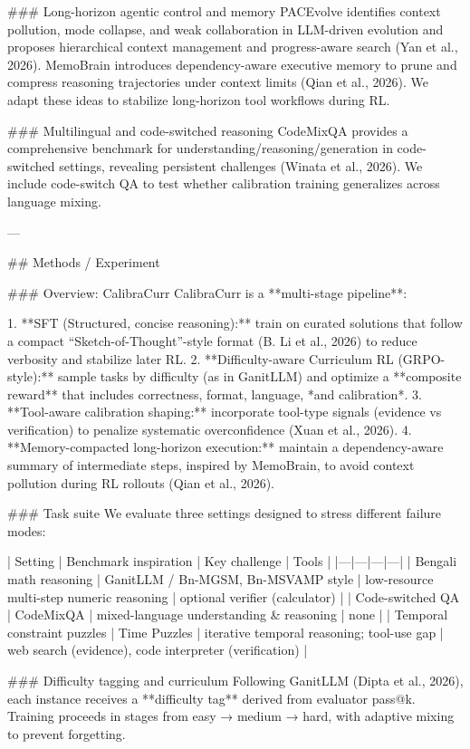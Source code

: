 ### Long-horizon agentic control and memory  
PACEvolve identifies context pollution, mode collapse, and weak collaboration in LLM-driven evolution and proposes hierarchical context management and progress-aware search (Yan et al., 2026). MemoBrain introduces dependency-aware executive memory to prune and compress reasoning trajectories under context limits (Qian et al., 2026). We adapt these ideas to stabilize long-horizon tool workflows during RL.

### Multilingual and code-switched reasoning  
CodeMixQA provides a comprehensive benchmark for understanding/reasoning/generation in code-switched settings, revealing persistent challenges (Winata et al., 2026). We include code-switch QA to test whether calibration training generalizes across language mixing.

---

## Methods / Experiment  

### Overview: CalibraCurr  
CalibraCurr is a **multi-stage pipeline**:

1. **SFT (Structured, concise reasoning):** train on curated solutions that follow a compact “Sketch-of-Thought”-style format (B. Li et al., 2026) to reduce verbosity and stabilize later RL.  
2. **Difficulty-aware Curriculum RL (GRPO-style):** sample tasks by difficulty (as in GanitLLM) and optimize a **composite reward** that includes correctness, format, language, *and calibration*.  
3. **Tool-aware calibration shaping:** incorporate tool-type signals (evidence vs verification) to penalize systematic overconfidence (Xuan et al., 2026).  
4. **Memory-compacted long-horizon execution:** maintain a dependency-aware summary of intermediate steps, inspired by MemoBrain, to avoid context pollution during RL rollouts (Qian et al., 2026).  

### Task suite  
We evaluate three settings designed to stress different failure modes:

| Setting | Benchmark inspiration | Key challenge | Tools |
|---|---|---|---|
| Bengali math reasoning | GanitLLM / Bn-MGSM, Bn-MSVAMP style | low-resource multi-step numeric reasoning | optional verifier (calculator) |
| Code-switched QA | CodeMixQA | mixed-language understanding & reasoning | none |
| Temporal constraint puzzles | Time Puzzles | iterative temporal reasoning; tool-use gap | web search (evidence), code interpreter (verification) |

### Difficulty tagging and curriculum  
Following GanitLLM (Dipta et al., 2026), each instance receives a **difficulty tag** derived from evaluator pass@k. Training proceeds in stages from easy → medium → hard, with adaptive mixing to prevent forgetting.

